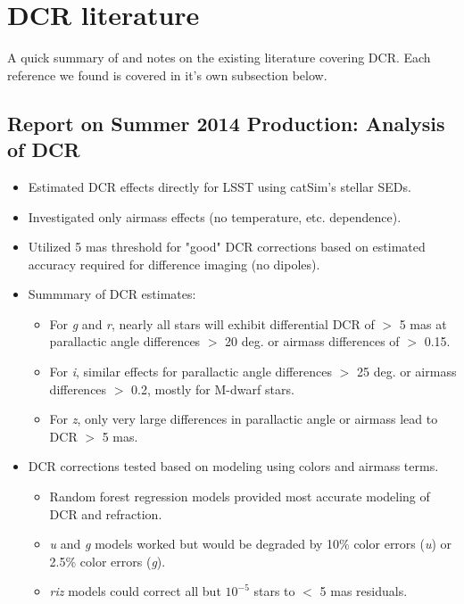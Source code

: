 \documentclass[DM,authoryear,toc]{lsstdoc}
\begin{document}
\section{DCR literature}
A quick summary of and notes on the existing literature covering DCR. Each reference we found is covered in it's own subsection below.

\subsection{Report on Summer 2014 Production: Analysis of DCR }

\begin{itemize}
	\item Estimated DCR effects directly for LSST using catSim's stellar
	SEDs.
	\item Investigated only airmass effects (no temperature,
          etc. dependence).
	\item Utilized 5 mas threshold for "good" DCR corrections
          based on estimated accuracy required for difference imaging
          (no dipoles).
	\item Summmary of DCR estimates:
	
	\begin{itemize}
		
		\item For \textit{g} and \textit{r}, nearly all stars
                  will exhibit differential DCR of $>$ 5 mas at
                  parallactic angle differences $>$ 20 deg. or airmass
                  differences of $>$ 0.15.
		\item For \textit{i}, similar effects for parallactic
                  angle differences $>$ 25 deg. or airmass differences
                  $>$ 0.2, mostly for M-dwarf stars.
		\item For \textit{z}, only very large differences in
                  parallactic angle or airmass lead to DCR $>$ 5 mas.
	\end{itemize}
	\item DCR corrections tested based on modeling using colors and airmass terms.
	\begin{itemize}
		\item Random forest regression models provided most
                  accurate modeling of DCR and refraction.
		\item \textit{u} and \textit{g} models worked but
                  would be degraded by 10\% color errors (\textit{u})
                  or 2.5\% color errors (\textit{g}).
		\item \textit{riz} models could correct all but
                  $10^{-5}$ stars to $<$ 5 mas residuals.
	\end{itemize}
\end{itemize}
\end{document}
